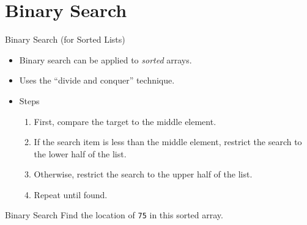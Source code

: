 \documentclass[14pt,aspectratio=1610]{beamer}
\begin{document}
\section{Binary Search}

\begin{frame}{Binary Search (for Sorted Lists)}
\begin{itemize}[<+->]
  \item
    Binary search can be applied to \emph{sorted} arrays.
  \item
    Uses the ``divide and conquer'' technique.
  \item
    Steps
    \begin{enumerate}
      \item
        First, compare the target to the middle element.
      \item
        If the search item is less than the middle element, restrict the search to the lower half of the list.
      \item
        Otherwise, restrict the search to the upper half of the list.
      \item
        Repeat until found.
    \end{enumerate}
\end{itemize}
\end{frame}


\begin{frame}{Binary Search}
\center%
Find the location of \texttt{75} in this sorted array.

\end{frame}
\end{document}

